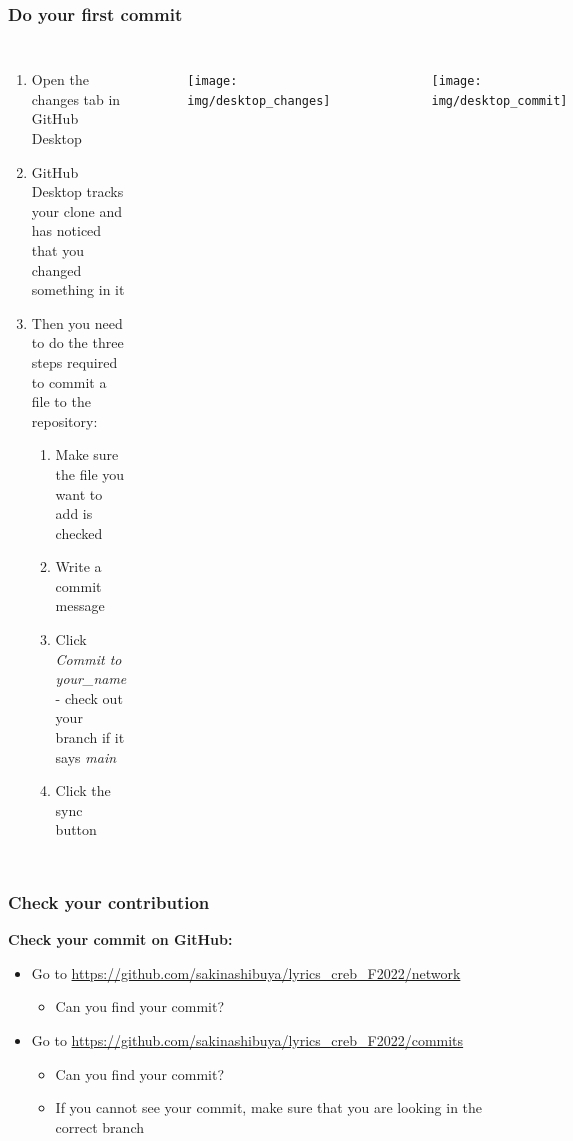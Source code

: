\documentclass[aspectratio=169]{beamer} %
\newcommand{\trainingURL}[1]{{\color{blue}\url{#1}}}
\newcommand{\traininerUsername}{sakinashibuya}
\newcommand{\repoName}{\traininerUsername/lyrics_creb_F2022}
\newcommand{\trainingRepoURL}[1]{\trainingURL{https://github.com/\repoName #1}}
\begin{document}
\begin{frame}
\frametitle{Do your first commit}

\begin{columns}[c]


\begin{enumerate}
	\item Open the changes tab in GitHub Desktop
	\item GitHub Desktop tracks your clone and has noticed that you changed something in it
	\item Then you need to do the three steps required to commit a file to the repository:
	\begin{enumerate}
		\item Make sure the file you want to add is checked
		\item Write a commit message
		\item Click \textit{Commit to your\_name} - check out your branch if it says \textit{main}
		\item Click the sync button
	\end{enumerate}
\end{enumerate}

\begin{figure}
	\centering
	\texttt{[image: img/desktop\_changes]}
	\label{fig:desktopchanges}
\end{figure}

\vspace{-1cm}

\begin{figure}
	\centering
	\texttt{[image: img/desktop\_commit]}
	\label{fig:desktop_commit}
\end{figure}

\end{columns}

\end{frame}

\begin{frame}
\frametitle{Check your contribution}

	\textbf{Check your commit on GitHub:}
	\begin{itemize}
		\item Go to \trainingRepoURL{/network}
		\begin{itemize}
			\item Can you find your commit?
		\end{itemize}
		\item Go to \trainingRepoURL{/commits}
		\begin{itemize}
			\item Can you find your commit?
			\item If you cannot see your commit, make sure that you are looking in the correct branch
		\end{itemize}
	\end{itemize}

\end{frame}
\end{document}
